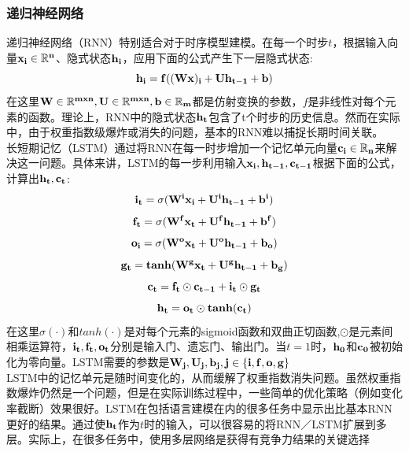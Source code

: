 \subsubsection{递归神经网络}
递归神经网络（RNN）特别适合对于时序模型建模。在每一个时步$t$，根据输入向量$\bf{x}_{i} \in \mathbb{R}^{n}$、隐式状态$\bf{h}_{i}$，应用下面的公式产生下一层隐式状态:\\
\begin{equation}
\bf{h}_{i} = f(\bf(Wx)_{i}+\bf{Uh}_{t-1}+\bf{b})
\end{equation}
在这里$\bf{W} \in \mathbb{R}^{m x n},\bf{U} \in \mathbb{R}^{m x n},\bf{b} \in \mathbb{R}_{m}$都是仿射变换的参数，$f$是非线性对每个元素的函数。理论上，RNN中的隐式状态$\bf{h}_{t}$包含了t个时步的历史信息。然而在实际中，由于权重指数级爆炸或消失的问题，基本的RNN难以捕捉长期时间关联。\\
长短期记忆（LSTM）通过将RNN在每一时步增加一个记忆单元向量$\bf{c}_{i} \in \mathbb{R}_{n}$来解决这一问题。具体来讲，LSTM的每一步利用输入$\bf{x}_{i},\bf{h}_{t-1},\bf{c}_{t-1}$根据下面的公式，计算出$\bf{h}_{t},\bf{c}_{t}$:\\
\begin{equation}
\bf{i}_{t} = \sigma(\bf{W}^{i}\bf{x}_{i}+\bf{U}^{i}\bf{h}_{t-1}+\bf{b}^{i})
\end{equation}
\begin{equation}
\bf{f}_{t} = \sigma(\bf{W}^{f}\bf{x}_{t}+\bf{U}^{f}\bf{h}_{t-1}+\bf{b}^{f})
\end{equation}
\begin{equation}
\bf{o}_{i} = \sigma(\bf{W}^{o}\bf{x}_{t}+\bf{U}^{o}\bf{h}_{t-1}+\bf{b}_{o})
\end{equation}
\begin{equation}
\bf{g}_{t} = tanh(\bf{W}^{g}\bf{x}_{t}+\bf{U}^{g}\bf{h}_{t-1}+\bf{b}_{g})
\end{equation}
\begin{equation}
\bf{c}_{t} = \bf{f}_{t}\odot\bf{c}_{t-1}+\bf{i}_{t}\odot\bf{g}_{t}
\end{equation}
\begin{equation}
\bf{h}_t = \bf{o}_{t}\odot tanh(\bf{c}_{t})
\end{equation}
在这里$\sigma(\cdot)$和$tanh(\cdot)$是对每个元素的sigmoid函数和双曲正切函数,$\odot$是元素间相乘运算符，$\bf{i}_{t},\bf{f}_{t},\bf{o}_{t}$分别是输入门、遗忘门、输出门。当$t=1$时，$\bf{h}_{0}$和$\bf{c}_{0}$被初始化为零向量。LSTM需要的参数是$\bf{W}_{j},\bf{U}_{j},\bf{b}_{j},j\in\{i,f,o,g\}$\\
LSTM中的记忆单元是随时间变化的，从而缓解了权重指数消失问题。虽然权重指数爆炸仍然是一个问题，但是在实际训练过程中，一些简单的优化策略（例如变化率截断）效果很好。LSTM在包括语言建模在内的很多任务中显示出比基本RNN更好的结果。通过使$\bf{h}_{t}$作为$t$时的输入，可以很容易的将RNN／LSTM扩展到多层。实际上，在很多任务中，使用多层网络是获得有竞争力结果的关键选择\\
